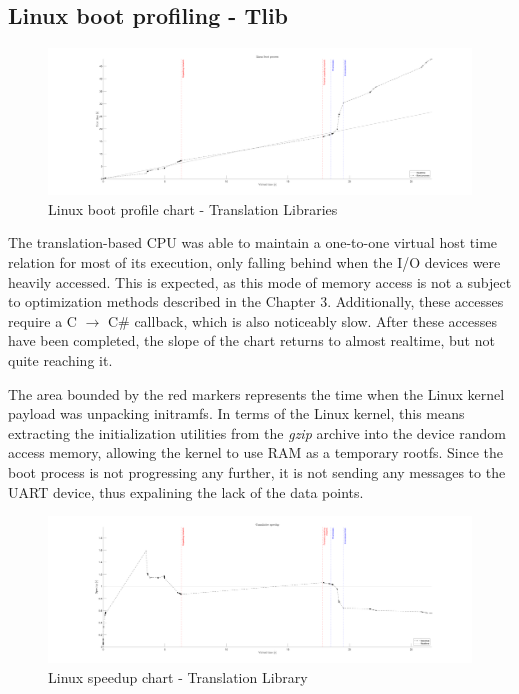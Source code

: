 \subsection*{Linux boot profiling - Tlib}
\begin{figure}[h]
	\centering
    \hspace*{-2cm}
	\includegraphics[width=1.2\textwidth]{figures/benchmarks/linux_boot/adnotated/TlibBoot.pdf}
	\caption{Linux boot profile chart - Translation Libraries}
\end{figure}

\noindent
The translation-based CPU was able to maintain a one-to-one virtual host time relation for most of
its execution, only falling behind when the I/O devices were heavily accessed. This is expected, as this mode of memory
access is not a subject to optimization methods described in the Chapter 3. Additionally, these accesses require a C
$\rightarrow$ C\# callback, which is also noticeably slow. After these accesses have been completed, the slope of the
chart returns to almost realtime, but not quite reaching it.

The area bounded by the red markers represents the time when the Linux kernel payload was unpacking initramfs. In terms
of the Linux kernel, this means extracting the initialization utilities from the \textit{gzip} archive into the
device random access memory, allowing the kernel to use RAM as a temporary rootfs. Since the boot process is not
progressing any further, it is not sending any messages to the UART device, thus expalining the lack of the data
points.

\begin{figure}[h]
	\centering
    \hspace*{-2cm}
	\includegraphics[width=1.2\textwidth]{figures/benchmarks/linux_boot/adnotated/TlibSpeedup.pdf}
	\caption{Linux speedup chart - Translation Library}
\end{figure}


